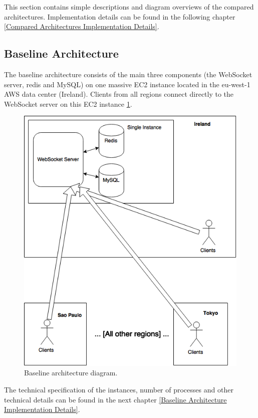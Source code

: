 \documentclass{uvamscse}
\begin{document}
This section contains simple descriptions and diagram overviews of the compared architectures. Implementation details can be found in the following chapter \ref{Compared Architectures Implementation Details}.

\subsection{Baseline Architecture}\label{Baseline Architecture}
The baseline architecture consists of the main three components (the WebSocket server, redis and MySQL) on one massive EC2 instance located in the eu-west-1 AWS data center (Ireland). Clients from all regions connect directly to the WebSocket server on this EC2 instance \ref{figure:baseline}.

\begin{figure}[H]
\centering
\includegraphics[scale=0.3]{baseline}
\caption{Baseline architecture diagram.}
\label{figure:baseline}
\end{figure}


The technical specification of the instances, number of processes and other technical details can be found in the next chapter \ref{Baseline Architecture Implementation Details}.
\end{document}
